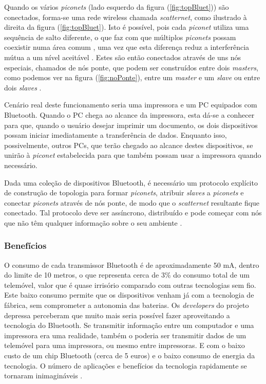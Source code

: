 \documentclass[conference]{IEEEtran}
\begin{document}
Quando os vários \textit{piconets} (lado esquerdo da figura (\ref{fig:topBluet})) são conectados, forma-se uma rede wireless chamada \textit{scatternet}, como ilustrado à direita da figura (\ref{fig:topBluet}).
Isto é possível, pois cada \textit{piconet} utiliza uma sequência de salto diferente, o que faz com que múltiplos \textit{piconets} possam coexistir numa área comum \cite{salonidis2005distributed}, uma vez que esta diferença reduz a interferência mútua a um nível aceitável \cite{prasad2004ofdm}. 
Estes são então conectados através de uns nós especiais, chamados de nós ponte, que podem ser construídos entre dois \textit{masters}, como podemos ver na figura (\ref{fig:noPonte}), entre um \textit{master} e um \textit{slave} ou entre dois \textit{slaves} \cite{salonidis2005distributed}.

Cenário real deste funcionamento seria uma impressora e um PC equipados com Bluetooth. Quando o PC chega ao alcance da impressora, esta dá-se a conhecer para que, quando o usuário desejar imprimir um documento, os dois dispositivos possam iniciar imediatamente a transferência de dados. Enquanto isso, possivelmente, outros PCs, que terão chegado ao alcance destes dispositivos, se unirão à \textit{piconet} estabelecida para que também possam usar a impressora quando necessário.

Dada uma coleção de dispositivos Bluetooth, é necessário um protocolo explícito de construção de topologia para formar \textit{piconets}, atribuir \textit{slaves} a \textit{piconets} e conectar \textit{piconets} através de nós ponte, de modo que o \textit{scatternet} resultante fique conectado. Tal protocolo deve ser assíncrono, distribuído e pode começar com nós que não têm qualquer informação sobre o seu ambiente \cite{salonidis2005distributed}.

\subsubsection{Benefícios}

O consumo de cada transmissor Bluetooth é de aproximadamente 50 mA, dentro do limite de 10 metros, o que representa cerca de 3\% do consumo total de um telemóvel, valor que é quase irrisório comparado com outras tecnologias sem fio. 
Este baixo consumo permite que os dispositivos venham já com a tecnologia de fábrica, sem comprometer a autonomia das baterias. 
Os \textit{developers} do projeto depressa perceberam que muito mais seria possível fazer aproveitando a tecnologia do Bluetooth. 
Se transmitir informação entre um computador e uma impressora era uma realidade, também o poderia ser transmitir dados de um telemóvel para uma impressora, ou mesmo entre impressoras. 
E com o baixo custo de um chip Bluetooth (cerca de 5 euros) e o baixo consumo de energia da tecnologia. 
O número de aplicações e benefícios da tecnologia rapidamente se tornaram inimagináveis \cite{kobayashi2004tecnologia}.
\end{document}
